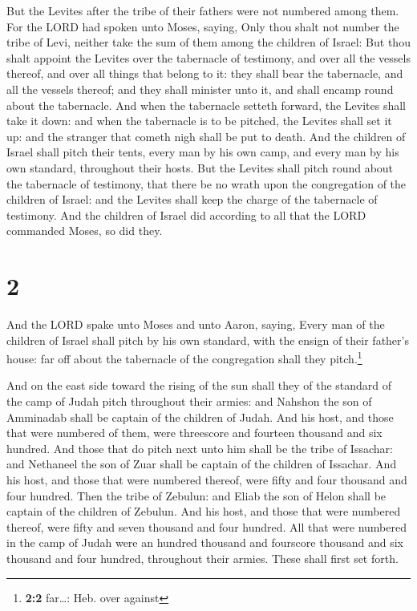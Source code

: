  But the Levites after the tribe of their fathers were
not numbered among them.  For the LORD had spoken unto
Moses, saying,  Only thou shalt not number the tribe of
Levi, neither take the sum of them among the children of Israel:
 But thou shalt appoint the Levites over the tabernacle
of testimony, and over all the vessels thereof, and over all things that
belong to it: they shall bear the tabernacle, and all the vessels
thereof; and they shall minister unto it, and shall encamp round about
the tabernacle.  And when the tabernacle setteth forward,
the Levites shall take it down: and when the tabernacle is to be
pitched, the Levites shall set it up: and the stranger that cometh nigh
shall be put to death.  And the children of Israel shall
pitch their tents, every man by his own camp, and every man by his own
standard, throughout their hosts.  But the Levites shall
pitch round about the tabernacle of testimony, that there be no wrath
upon the congregation of the children of Israel: and the Levites shall
keep the charge of the tabernacle of testimony.  And the
children of Israel did according to all that the LORD commanded Moses,
so did they.

\hypertarget{section-1}{%
\section{2}\label{section-1}}

 And the LORD spake unto Moses and unto Aaron, saying,
 Every man of the children of Israel shall pitch by his
own standard, with the ensign of their father's house: far off about the
tabernacle of the congregation shall they pitch.\footnote{\textbf{2:2}
  far\ldots: Heb. over against}

 And on the east side toward the rising of the sun shall
they of the standard of the camp of Judah pitch throughout their armies:
and Nahshon the son of Amminadab shall be captain of the children of
Judah.  And his host, and those that were numbered of
them, were threescore and fourteen thousand and six hundred.
 And those that do pitch next unto him shall be the tribe
of Issachar: and Nethaneel the son of Zuar shall be captain of the
children of Issachar.  And his host, and those that were
numbered thereof, were fifty and four thousand and four hundred.
 Then the tribe of Zebulun: and Eliab the son of Helon
shall be captain of the children of Zebulun.  And his
host, and those that were numbered thereof, were fifty and seven
thousand and four hundred.  All that were numbered in the
camp of Judah were an hundred thousand and fourscore thousand and six
thousand and four hundred, throughout their armies. These shall first
set forth.

